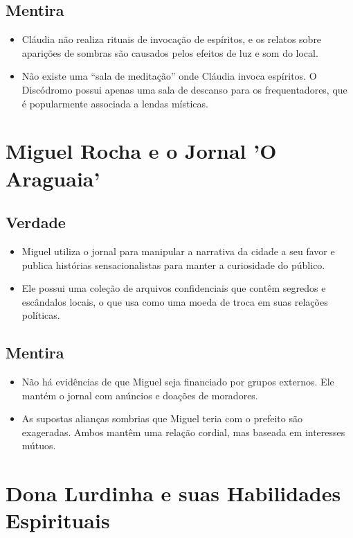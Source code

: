 \subsection*{Mentira}
\begin{itemize}
    \item Cláudia não realiza rituais de invocação de espíritos, e os relatos sobre aparições de sombras são causados pelos efeitos de luz e som do local.
    \item Não existe uma “sala de meditação” onde Cláudia invoca espíritos. O Discódromo possui apenas uma sala de descanso para os frequentadores, que é popularmente associada a lendas místicas.
\end{itemize}

\section{Miguel Rocha e o Jornal 'O Araguaia'}

\subsection*{Verdade}
\begin{itemize}
    \item Miguel utiliza o jornal para manipular a narrativa da cidade a seu favor e publica histórias sensacionalistas para manter a curiosidade do público.
    \item Ele possui uma coleção de arquivos confidenciais que contêm segredos e escândalos locais, o que usa como uma moeda de troca em suas relações políticas.
\end{itemize}

\subsection*{Mentira}
\begin{itemize}
    \item Não há evidências de que Miguel seja financiado por grupos externos. Ele mantém o jornal com anúncios e doações de moradores.
    \item As supostas alianças sombrias que Miguel teria com o prefeito são exageradas. Ambos mantêm uma relação cordial, mas baseada em interesses mútuos.
\end{itemize}

\section{Dona Lurdinha e suas Habilidades Espirituais}

